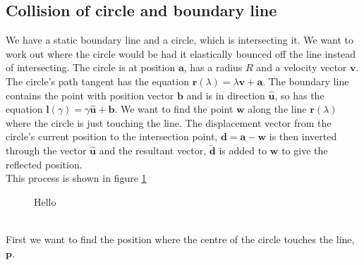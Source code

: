 \documentclass[12pt]{article}
\begin{document}
\subsection{Collision of circle and boundary line}
We have a static boundary line and a circle, which is intersecting it. We want to work out where the circle would be had it elastically bounced off the line instead of intersecting. The circle is at position $\mathbf{a}$, has a radius $R$ and a velocity vector $\mathbf{v}$. The circle's path tangent has the equation $\mathbf{r}(\lambda) = \lambda \mathbf{v} + \mathbf{a}$.
The boundary line contains the point with position vector $\mathbf{b}$ and is in direction $\mathbf{\hat{u}}$, so has the equation $\mathbf{l}(\gamma) = \gamma \mathbf{\hat{u}} + \mathbf{b}$. We want to find the point $\mathbf{w}$ along the line $\mathbf r(\lambda)$ where the circle is just touching the line. 
The displacement vector from the circle's current position to the intersection point, $\mathbf{d} = \mathbf{a}-\mathbf{w}$ is then inverted through the vector $\mathbf{\hat{u}}$ and the resultant vector, $\mathbf{\tilde d}$ is added to $\mathbf{w}$ to give the reflected position.
\\ 
This process is shown in figure \ref{fig:line_circle_collision}
\begin{figure}
	\centering
	\qquad
	\qquad
	\caption{Hello}
	\label{fig:line_circle_collision}
\end{figure}
\\
First we want to find the position where the centre of the circle touches the line, $\mathbf{p}$.
\end{document}
